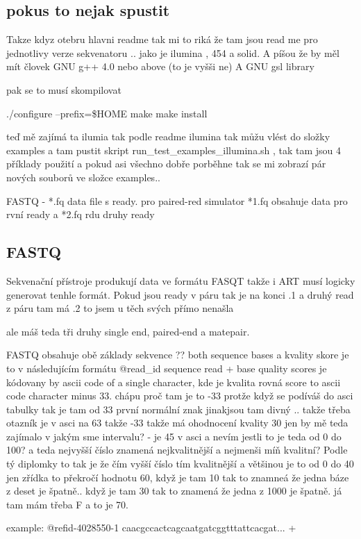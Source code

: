 \documentclass[czech,DP]{thesiskiv}
\begin{document}
\subsection{pokus to nejak spustit}
Takze kdyz otebru hlavni readme tak mi to riká že tam jsou read me pro jednotlivy verze sekvenatoru .. jako je ilumina , 454 a solid.
A píšou že by měl mít človek GNU g++ 4.0 nebo above (to je vyšši ne)
A GNU gsl library

pak se to musí skompilovat 

./configure --prefix=\$HOME
	       	make
	       	make install	 
	 
teď mě zajímá ta ilumia tak podle readme ilumina tak můžu vlést do složky examples a tam pustit skript run\_test\_examples\_illumina.sh , tak tam jsou 4 příklady použití 
a pokud asi všechno dobře porběhne tak se mi zobrazí pár nových souborů ve složce examples.. 

FASTQ - *.fq data file s ready. pro paired-red simulator
*1.fq obsahuje data pro rvní ready a *2.fq rdu druhy ready

\subsection{FASTQ}
Sekvenační přístroje produkují data ve formátu FASQT takže i ART musí logicky generovat tenhle formát.
Pokud jsou ready v páru tak je na konci .1
a druhý read z páru tam má .2 to jsem u těch svých přímo nenašla 

ale máš teda tři druhy single end, paired-end a matepair. 

FASTQ obsahuje obě základy sekvence ?? both sequence bases a kvality skore je to v následujícím formátu
@read\_id
sequence read
+
base quality scores je kódovany by ascii code of a single character, kde je kvalita rovná score to ascii code character minus 33. chápu proč tam je to -33 protže když se podíváš do asci tabulky tak je tam od 33 první normální znak jinakjsou tam divný .. 
takže třeba otazník je v asci na 63 takže -33 takže má ohodnocení kvality 30
jen by mě teda zajímalo v jakým sme intervalu? - je 45 v asci a nevím jestli to je teda od 0 do 100?  a teda nejvyšší číslo znamená nejkvalitnější a nejmenši míň kvalitní? Podle tý diplomky to tak je že čím vyšší číslo tím kvalitnější a většinou je to od 0 do 40 jen zřídka to překročí hodnotu 60, když je tam 10 tak to znamneá že jedna báze z deset je špatně.. když je tam 30 tak to znamená že jedna z 1000 je špatně.
já tam mám třeba F a to je 70.

example:
		@refid-4028550-1 
		caacgccactcagcaatgatcggtttattcacgat...
		+ 
\end{document}
